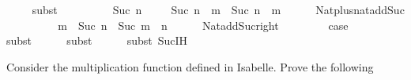\begin{isabellebody}
\ \ \ \ \isamarkupfalse%
{\isacharparenleft}{\kern0pt}subst\ {}{\isacharparenright}{\kern0pt}\isanewline
\ \ \ \ \isacommand{{\isachardot}{\kern0pt}{\isachardot}{\kern0pt}}\isamarkupfalse%
\isanewline
\isanewline
{}\isamarkupfalse%
\isanewline
\ \ \isamarkupfalse%
\ {\isacharparenleft}{\kern0pt}Suc\ n{\isacharparenright}{\kern0pt}\isanewline
\ \ \isamarkupfalse%
\ {}{\isacharcolon}{\kern0pt}\ {\isachardoublequoteopen}{\isacharparenleft}{\kern0pt}Suc\ n{\isacharparenright}{\kern0pt}\ {\isacharplus}{\kern0pt}\ m\ {\isacharequal}{\kern0pt}\ Suc\ {\isacharparenleft}{\kern0pt}n\ {\isacharplus}{\kern0pt}\ m{\isacharparenright}{\kern0pt}{\isachardoublequoteclose}\isanewline
\ \ \ \ \isamarkupfalse%
\ Nat{\isachardot}{\kern0pt}plus{\isacharunderscore}{\kern0pt}nat{\isachardot}{\kern0pt}add{\isacharunderscore}{\kern0pt}Suc\isanewline
\ \ \ \ \isacommand{{\isachardot}{\kern0pt}}\isamarkupfalse%
\isanewline
\isanewline
\ \ \isamarkupfalse%
\ {}{\isacharcolon}{\kern0pt}\ {\isachardoublequoteopen}m\ {\isacharplus}{\kern0pt}\ Suc\ n\ {\isacharequal}{\kern0pt}\ Suc\ {\isacharparenleft}{\kern0pt}m\ {\isacharplus}{\kern0pt}\ n{\isacharparenright}{\kern0pt}{\isachardoublequoteclose}\isanewline
\ \ \ \ \isamarkupfalse%
\ Nat{\isachardot}{\kern0pt}add{\isacharunderscore}{\kern0pt}Suc{\isacharunderscore}{\kern0pt}right\isanewline
\ \ \ \ \isacommand{{\isachardot}{\kern0pt}}\isamarkupfalse%
\isanewline
\isanewline
\ \ \isamarkupfalse%
\ {\isacharquery}{\kern0pt}case\isanewline
\ \ \ \ \isamarkupfalse%
{\isacharparenleft}{\kern0pt}subst\ {}{\isacharparenright}{\kern0pt}\isanewline
\ \ \ \ \isamarkupfalse%
{\isacharparenleft}{\kern0pt}subst\ {}{\isacharparenright}{\kern0pt}\isanewline
\ \ \ \ \isamarkupfalse%
{\isacharparenleft}{\kern0pt}subst\ Suc{\isachardot}{\kern0pt}IH{\isacharparenright}{\kern0pt}\isanewline
\ \ \ \ \isacommand{{\isachardot}{\kern0pt}{\isachardot}{\kern0pt}}\isamarkupfalse%
\isanewline
\isanewline
{}\isamarkupfalse%
%
\endisatagproof
{\isafoldproof}%
%
\isadelimproof
%
\endisadelimproof
%
\begin{isamarkuptext}%
%
\end{isamarkuptext}\isamarkuptrue%
%
\begin{isamarkuptext}%
Consider the multiplication function \isa{{\isacharparenleft}{\kern0pt}{\isacharasterisk}{\kern0pt}{\isacharparenright}{\kern0pt}} defined in Isabelle. Prove the following

\end{isamarkuptext}
\end{isabellebody}
